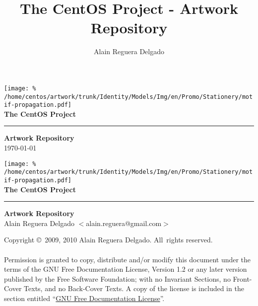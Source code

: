 \documentclass[12pt]{book}
\title{The CentOS Project - Artwork Repository}
\author{Alain Reguera Delgado}
\begin{document}
\pagestyle{empty}

\begin{titlepage}
\begin{flushright}
\noindent\texttt{[image: \%
    /home/centos/artwork/trunk/Identity/Models/Img/en/Promo/Stationery/motif-propagation.pdf]}\\
\vspace*{150pt}
\Huge\textbf{The CentOS Project}
\rule{\textwidth}{5pt}
\large
\textbf{Artwork Repository}\\
\vspace*{150pt}
\normalsize
\today
\end{flushright}
\end{titlepage}

\begin{titlepage}
\begin{flushright}
\noindent\texttt{[image: \%
    /home/centos/artwork/trunk/Identity/Models/Img/en/Promo/Stationery/motif-propagation.pdf]}\\
\vspace*{150pt}
\Huge\textbf{The CentOS Project}
\rule{\textwidth}{5pt}
\large
\textbf{Artwork Repository}\\
\vspace*{150pt}
\normalsize
Alain Reguera Delgado $<$alain.reguera@gmail.com$>$\\
\end{flushright}
\end{titlepage}


\noindent Copyright \copyright\ 2009, 2010 Alain Reguera Delgado. All\
rights reserved.\\
\\
\noindent Permission is granted to copy, distribute and/or modify this
document under the terms of the GNU Free Documentation License,
Version 1.2 or any later version published by the Free Software
Foundation; with no Invariant Sections, no Front-Cover Texts, and no
Back-Cover Texts. A copy of the license is included in the section
entitled ``\hyperlink{cha:Licenses:GFDL}{GNU Free Documentation
License}''.  
\end{document}

